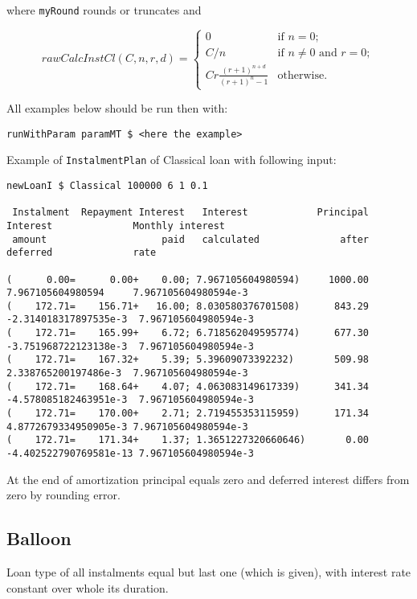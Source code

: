 \documentclass[letterpaper,11pt]{article}
\begin{document}
where {\tt myRound} rounds or truncates and

\begin{equation}
rawCalcInstCl (C, n, r, d) = \left\{ \begin{array}{ll}
                                0 & \mbox{if $n=0$};\\
                                C/n& \mbox{if $n \neq 0$ and $r=0$};\\
                                C r \frac{(r+1)^{n+d}}{(r+1)^n - 1} & \mbox{otherwise}.
                                \end{array} \right.
\end{equation}


All examples below should be run then with:
{\small
\begin{verbatim}
runWithParam paramMT $ <here the example>
\end{verbatim}
}

Example of {\tt InstalmentPlan} of Classical loan with following input:
{\footnotesize
\begin{verbatim}
newLoanI $ Classical 100000 6 1 0.1

 Instalment  Repayment Interest   Interest            Principal  Interest              Monthly interest
 amount                    paid   calculated              after  deferred              rate

(      0.00=      0.00+    0.00; 7.967105604980594)     1000.00  7.967105604980594     7.967105604980594e-3
(    172.71=    156.71+   16.00; 8.030580376701508)      843.29 -2.314018317897535e-3  7.967105604980594e-3
(    172.71=    165.99+    6.72; 6.718562049595774)      677.30 -3.751968722123138e-3  7.967105604980594e-3
(    172.71=    167.32+    5.39; 5.39609073392232)       509.98  2.338765200197486e-3  7.967105604980594e-3
(    172.71=    168.64+    4.07; 4.063083149617339)      341.34 -4.578085182463951e-3  7.967105604980594e-3
(    172.71=    170.00+    2.71; 2.719455353115959)      171.34  4.8772679334950905e-3 7.967105604980594e-3
(    172.71=    171.34+    1.37; 1.3651227320660646)       0.00 -4.402522790769581e-13 7.967105604980594e-3
\end{verbatim}
}

At the end of amortization principal equals zero and deferred interest differs from zero by rounding error.

\subsection{Balloon}
Loan type of all instalments equal but last one (which is given), with interest rate constant over whole its duration.
\end{document}
